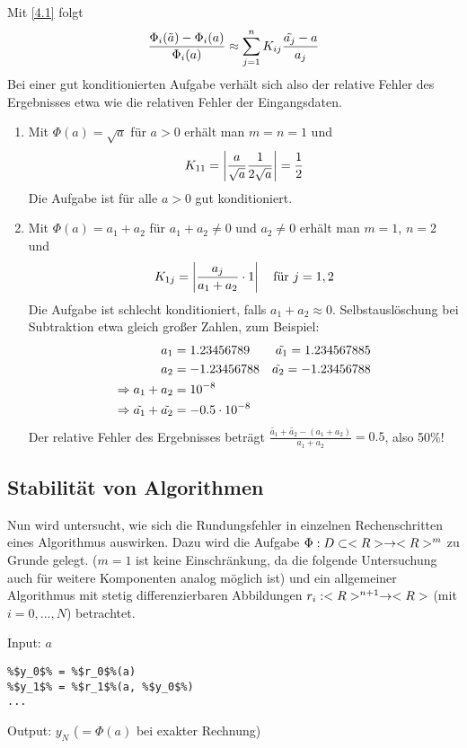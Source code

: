 Mit \cref{4.1} folgt
\begin{align}
	\frac{\Phi_i(\tilde{a}) - \Phi_i(a)}{\Phi_i(a)}\approx \sum_{j=1}^n K_{ij}\frac{\tilde{a_j}-a}{a_j}\notag
\end{align}
Bei einer gut konditionierten Aufgabe verhält sich also der relative Fehler des Ergebnisses etwa wie die relativen Fehler der Eingangsdaten.

\begin{example}
	\begin{enumerate}[label=(\alph*)]
		\item Mit $\Phi(a)=\sqrt{a}$ für $a>0$ erhält man $m=n=1$ und
		\begin{align}
			K_{11} = \left|\frac{a}{\sqrt{a}}\frac{1}{2\sqrt{a}}\right| = \frac{1}{2}\notag
		\end{align}
		Die Aufgabe ist für alle $a>0$ gut konditioniert.
		\item Mit $\Phi(a) = a_1+a_2$ für $a_1+a_2\neq 0$ und $a_2\neq 0$ erhält man $m=1$, $n=2$ und
		\begin{align}
			K_{1j} = \left|\frac{a_j}{a_1+a_2}\cdot 1\right|\quad\text{für } j=1,2\notag
		\end{align}
		Die Aufgabe ist schlecht konditioniert, falls $a_1+a_2\approx 0$. Selbstauslöschung bei Subtraktion etwa gleich großer Zahlen, zum Beispiel:
		\begin{align}
			a_1 &= 1.23456789 &\tilde{a_1} = 1.234567885 \notag \\
			a_2 &= -1.23456788 &\tilde{a_2} = -1.23456788 \notag \\
			\Rightarrow a_1+a_2 &= 10^{-8} \notag \\
			\Rightarrow \tilde{a_1} + \tilde{a_2} &= -0.5\cdot 10^{-8} \notag
		\end{align}
		Der relative Fehler des Ergebnisses beträgt $\frac{\tilde{a_1}+\tilde{a_2} - (a_1+a_2)}{a_1+a_2}=0.5$, also 50\%!
	\end{enumerate}
\end{example}

\subsection{Stabilität von Algorithmen}

Nun wird untersucht, wie sich die Rundungsfehler in einzelnen Rechenschritten eines Algorithmus auswirken. Dazu wird die Aufgabe $\Phi:D\subset<R>\to<R>^m$ zu Grunde gelegt. ($m=1$ ist keine Einschränkung, da die folgende Untersuchung auch für weitere Komponenten analog möglich ist) und ein allgemeiner Algorithmus mit stetig differenzierbaren Abbildungen $r_i:<R>^{n+1}\to<R>$ (mit $i=0,...,N$) betrachtet.

\begin{algorithm}
	Input: $a$
	\begin{lstlisting}
%$y_0$% = %$r_0$%(a)
%$y_1$% = %$r_1$%(a, %$y_0$%)
...
	\end{lstlisting}
	Output: $y_N$ ($=\Phi(a)$ bei exakter Rechnung)
\end{algorithm}